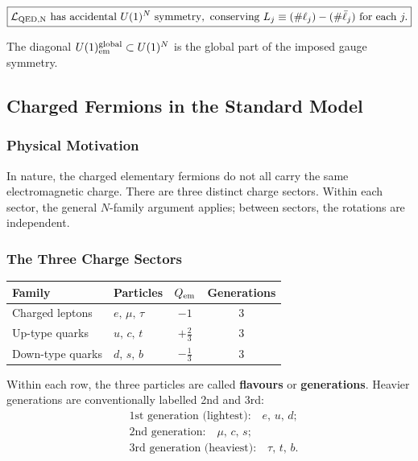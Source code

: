 \documentclass[../main.tex]{subfiles}
\begin{document}
\begin{equation}
  \boxed{
  \mathcal{L}_{\rm QED,N}\text{ has accidental }U(1)^N\text{ symmetry},
  \text{ conserving }L_j \equiv (\#\ell_j) - (\#\bar\ell_j)\text{ for each }j.}
  \label{eq:lec12:accN}
\end{equation}

The diagonal $U(1)_{\rm em}^{\rm global}\subset U(1)^N$ is the global part of the imposed gauge symmetry.

\subsection*{Charged Fermions in the Standard Model}\label{sec:lec12:smspectrum}

\subsubsection*{Physical Motivation}

In nature, the charged elementary fermions do not all carry the same electromagnetic charge.  There are three distinct charge sectors.  Within each sector, the general $N$-family argument applies; between sectors, the rotations are independent.

\subsubsection*{The Three Charge Sectors}

\begin{center}
\begin{tabular}{llcc}
  \toprule
  Family & Particles & $Q_{\rm em}$ & Generations \\
  \midrule
  Charged leptons & $e,\,\mu,\,\tau$ & $-1$ & 3 \\
  Up-type quarks  & $u,\,c,\,t$      & $+\tfrac{2}{3}$ & 3 \\
  Down-type quarks & $d,\,s,\,b$     & $-\tfrac{1}{3}$ & 3 \\
  \bottomrule
\end{tabular}
\end{center}

\medskip
Within each row, the three particles are called \textbf{flavours} or \textbf{generations}.  Heavier generations are conventionally labelled 2nd and 3rd:
\begin{align*}
  &\text{1st generation (lightest):} \quad e,\,u,\,d; \\
  &\text{2nd generation:} \quad \mu,\,c,\,s; \\
  &\text{3rd generation (heaviest):} \quad \tau,\,t,\,b.
\end{align*}
\end{document}
